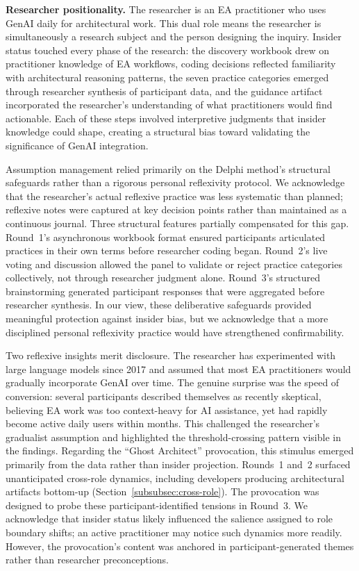 \textbf{Researcher positionality.} The researcher is an EA practitioner who
uses GenAI daily for architectural work. This dual role means the researcher
is simultaneously a research subject and the person designing the inquiry.
Insider status touched every phase of the research: the discovery workbook
drew on practitioner knowledge of EA workflows, coding decisions reflected
familiarity with architectural reasoning patterns, the seven practice
categories emerged through researcher synthesis of participant data, and the
guidance artifact incorporated the researcher's understanding of what
practitioners would find actionable. Each of these steps involved interpretive
judgments that insider knowledge could shape, creating a structural bias toward
validating the significance of GenAI integration.

Assumption management relied primarily on the Delphi method's structural
safeguards rather than a rigorous personal reflexivity protocol. We acknowledge
that the researcher's actual reflexive practice was less systematic than
planned; reflexive notes were captured at key decision points rather than
maintained as a continuous journal. Three structural features partially
compensated for this gap. Round~1's asynchronous workbook format ensured
participants articulated practices in their own terms before researcher coding
began. Round~2's live voting and discussion allowed the panel to validate or
reject practice categories collectively, not through researcher judgment alone.
Round~3's structured brainstorming generated participant responses that were
aggregated before researcher synthesis. In our view, these deliberative
safeguards provided meaningful protection against insider bias, but we
acknowledge that a more disciplined personal reflexivity practice would have
strengthened confirmability.

Two reflexive insights merit disclosure. The researcher has experimented with
large language models since 2017 and assumed that most EA practitioners would
gradually incorporate GenAI over time. The genuine surprise was the speed of
conversion: several participants described themselves as recently skeptical,
believing EA work was too context-heavy for AI assistance, yet had rapidly
become active daily users within months. This challenged the researcher's
gradualist assumption and highlighted the threshold-crossing pattern visible in
the findings. Regarding the ``Ghost
Architect'' provocation, this stimulus emerged primarily from the data rather
than insider projection. Rounds~1 and~2 surfaced unanticipated cross-role
dynamics, including developers producing architectural artifacts bottom-up
(Section~\ref{subsubsec:cross-role}). The provocation was designed to probe
these participant-identified tensions in Round~3. We acknowledge that insider
status likely influenced the salience assigned to role boundary shifts; an
active practitioner may notice such dynamics more readily. However, the
provocation's content was anchored in participant-generated themes rather than
researcher preconceptions.

